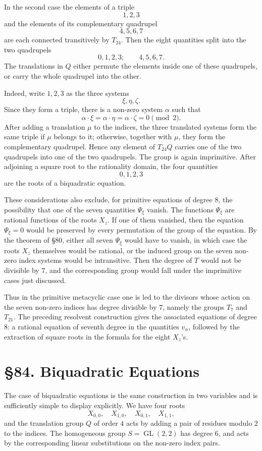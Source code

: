 \documentclass[11pt,a4paper]{book}
\newcommand{\webersection}[2]{\clearpage\section*{\S #1. #2}}
\DeclareMathOperator{\GL}{GL}
\begin{document}
In the second case the elements of a triple
\[
 1,2,3
\]
and the elements of its complementary quadrupel
\[
 4,5,6,7
\]
are each connected transitively by \(T_{24}\).  Then the eight quantities split into the two quadrupels
\[
 0,1,2,3;\qquad 4,5,6,7 .
\]
The translations in \(Q\) either permute the elements inside one of these quadrupels, or carry the whole quadrupel into the other.

Indeed, write \(1,2,3\) as the three systems
\[
 \xi,\eta,\zeta.
\]
Since they form a triple, there is a non-zero system \(\alpha\) such that
\[
 \alpha\cdot\xi=\alpha\cdot\eta=\alpha\cdot\zeta=0\pmod2.
\]
After adding a translation \(\mu\) to the indices, the three translated systems form the same triple if \(\mu\) belongs to it; otherwise, together with \(\mu\), they form the complementary quadrupel.  Hence any element of \(T_{24}Q\) carries one of the two quadrupels into one of the two quadrupels.  The group is again imprimitive.  After adjoining a square root to the rationality domain, the four quantities
\[
 0,1,2,3
\]
are the roots of a biquadratic equation.

These considerations also exclude, for primitive equations of degree \(8\), the possibility that one of the seven quantities \(\Psi_\xi\) vanish.  The functions \(\Psi_\xi\) are rational functions of the roots \(X_z\).  If one of them vanished, then the equation \(\Psi_\xi=0\) would be preserved by every permutation of the group of the equation.  By the theorem of \S 80, either all seven \(\Psi_\xi\) would have to vanish, in which case the roots \(X_z\) themselves would be rational, or the induced group on the seven non-zero index systems would be intransitive.  Then the degree of \(T\) would not be divisible by \(7\), and the corresponding group would fall under the imprimitive cases just discussed.

Thus in the primitive metacyclic case one is led to the divisors whose action on the seven non-zero indices has degree divisible by \(7\), namely the groups \(T_7\) and \(T_{21}\).  The preceding resolvent construction gives the associated equations of degree \(8\): a rational equation of seventh degree in the quantities \(v_\alpha\), followed by the extraction of square roots in the formula for the eight \(X_z\)'s.

\webersection{84}{Biquadratic Equations}

The case of biquadratic equations is the same construction in two variables and is sufficiently simple to display explicitly.  We have four roots
\[
 X_{0,0},\quad X_{1,0},\quad X_{0,1},\quad X_{1,1},
\]
and the translation group \(Q\) of order \(4\) acts by adding a pair of residues modulo \(2\) to the indices.  The homogeneous group \(S=\GL(2,2)\) has degree \(6\), and acts by the corresponding linear substitutions on the non-zero index pairs.
\end{document}
